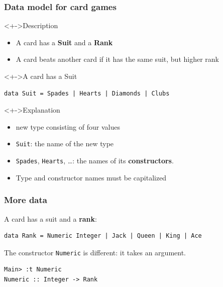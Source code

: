 \documentclass{beamer}
\begin{document}
\begin{frame}[fragile]
  \frametitle{Data model for card games}
  \begin{block}<+->{Description}
    \begin{itemize}
    \item A card has a \textbf{Suit} and a \textbf{Rank}
    \item A card beats another card if it has the same suit, but
      higher rank
    \end{itemize}
  \end{block}
  \begin{block}<+->{A card has a Suit}
\begin{lstlisting}
data Suit = Spades | Hearts | Diamonds | Clubs
\end{lstlisting}
  \end{block}
  \begin{alertblock}<+->{Explanation}
    \begin{itemize}
    \item new type consisting of four values
    \item  \texttt{Suit}: the name of the new type
    \item \texttt{Spades}, \texttt{Hearts}, \dots: the names of its
      \textbf{constructors}.
    \item Type and constructor names must be capitalized
    \end{itemize}
  \end{alertblock}
\end{frame}
\begin{frame}
  \frametitle{More data}
  A card has a suit and a \textbf{rank}:
\begin{lstlisting}
data Rank = Numeric Integer | Jack | Queen | King | Ace
\end{lstlisting}
The constructor \texttt{Numeric} is different: it takes an argument.
\begin{lstlisting}
Main> :t Numeric
Numeric :: Integer -> Rank
\end{lstlisting}
\end{frame}
\end{document}
